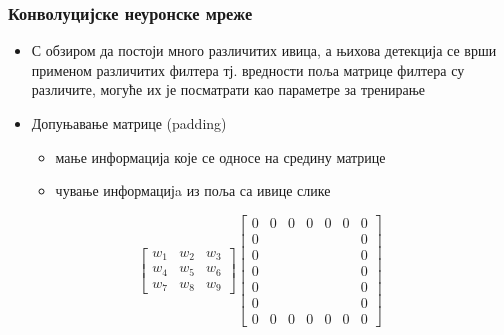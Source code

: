 \begin{frame}
\frametitle{Конволуцијске неуронске мреже} 
\begin{itemize}
 \item С обзиром да постоји \alert{много различитих ивица},
  а њихова детекција се врши
  применом различитих филтера тј. вредности 
  \alert{поља матрице филтера} су различите,
  могуће их је посматрати као \alert{параметре} за \alert{тренирање}
 \item \alert{Допуњавање матрице} (\alert{padding})
  \begin{itemize}
  \item мање информација које се односе на средину матрице
  \item чување информацијa из поља са ивице слике
  \end{itemize}
\end{itemize}
\begin{equation}
  \begin{bmatrix}
  w_1 & w_2 & w_3 \\
  w_4 & w_5 & w_6 \\
  w_7 & w_8 & w_9
  \end{bmatrix}
  \begin{bmatrix}
  0 & 0 & 0 & 0 & 0 & 0 & 0 \\
  0 &   &   &   &   &   & 0 \\
  0 &   &   &   &   &   & 0 \\
  0 &   &   &   &   &   & 0 \\
  0 &   &   &   &   &   & 0 \\
  0 &   &   &   &   &   & 0 \\
  0 & 0 & 0 & 0 & 0 & 0 & 0
  \end{bmatrix}
  \end{equation}
\end{frame}

